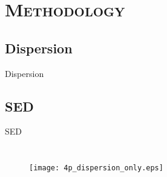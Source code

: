 \documentclass{beamer}
\begin{document}
\section{\scshape Methodology}
\subsection{Dispersion}
\begin{frame}{\small{Dispersion}}
\begin{figure}[!h]
\vspace*{-0.5cm}
\begin{center}
\renewcommand{\figure}{Fig.}
\label{fig:sed}
\end{center}
\end{figure}
\begin{figure}[!h]
\vspace*{-0.25cm}
\begin{center}
\renewcommand{\figure}{Fig.}
\label{fig:dispersion}
\end{center}
\end{figure}
\end{frame}


\subsection{SED}
\begin{frame}{SED}
\begin{columns}
\begin{figure}[t]
\vspace*{-1cm}
\texttt{[image: 4p\_dispersion\_only.eps]}
\renewcommand{\figure}{Fig.}
\label{fig:disp_4p}
\end{figure}
\begin{figure}[t]
\vspace*{-1cm}
\renewcommand{\figure}{Fig.}
\label{fig:sed}
\end{figure}
\end{columns}
\end{frame}
\end{document}
